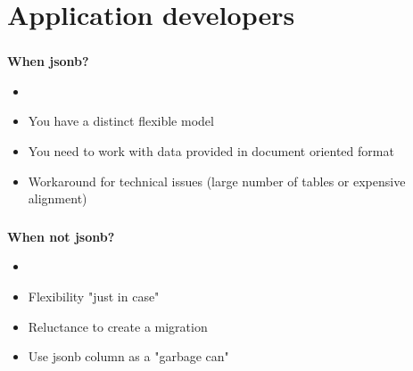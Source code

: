 \documentclass[usenames,dvipsnames, 18pt, compress, aspectratio=169]{beamer}
\begin{document}
\fontsize{13pt}{14}\selectfont
\section{Application developers}
\fontsize{17pt}{18}\selectfont

\begin{frame}
    \frametitle{}
    \begin{center}
    \textbf{When jsonb?}
        \begin{itemize}
            \item <+->
        \end{itemize}

        \begin{itemize}[label={\MVRightarrow}]
            \item <+-> You have a distinct flexible model
            \item <+-> You need to work with data provided in document oriented format
            \item <+-> Workaround for technical issues (large number of tables or expensive alignment)
        \end{itemize}

    \end{center}
\end{frame}

\begin{frame}
    \frametitle{}
    \begin{center}
    \textbf{When not jsonb?}
        \begin{itemize}
            \item <+->
        \end{itemize}

        \begin{itemize}[label={\MVRightarrow}]
            \item <+-> Flexibility "just in case"
            \item <+-> Reluctance to create a migration
            \item <+-> Use jsonb column as a "garbage can"
        \end{itemize}

    \end{center}
\end{frame}
\end{document}

